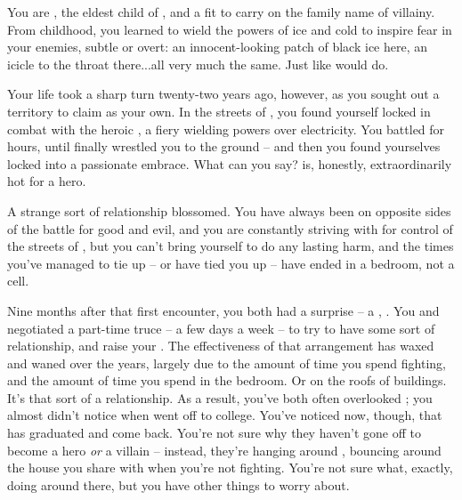 \documentclass[char]{LRSguildcamp1}
\begin{document}
\name{\cOldest{}}

You are \cOldest{\intro}, the eldest child of \cGrandma{\intro}, and a \cOldest{\offspring} fit to carry on the family name of villainy.  
From childhood, you learned to wield the powers of ice and cold to inspire fear in your enemies, subtle or overt: an innocent-looking patch of black ice here, an icicle to the throat there...all very much the same.  Just like \cGrandma{\Parent} would do.


Your life took a sharp turn twenty-two years ago, however, as you sought out a territory to claim as your own.  In the streets of \pCityO{}, you found yourself locked in combat with the heroic \cOS{\intro}, a fiery \cOS{\hero} wielding powers over electricity.  You battled for hours, until \cOldest{\they} finally wrestled you to the ground -- and then you found yourselves locked into a passionate embrace.  What can you say?  \cOS{} is, honestly, extraordinarily hot for a hero.

A strange sort of relationship blossomed.  You have always been on opposite sides of the battle for good and evil, and you are constantly striving with \cOS{\them} for control of the streets of \pCityO{}, but you can't bring yourself to do \cOS{\them} any lasting harm, and the times you've managed to tie \cOS{\them} up -- or \cOS{\they} have tied you up -- have ended in a bedroom, not a cell.

Nine months after that first encounter, you both had a surprise -- a \cGrad{\offspring}, \cGrad{\intro}.  You and \cOS{} negotiated a part-time truce -- a few days a week -- to try to have some sort of relationship, and raise your \cGrad{\offspring}.  The effectiveness of that arrangement has waxed and waned over the years, largely due to the amount of time you spend fighting, and the amount of time you spend in the bedroom.  Or on the roofs of buildings.  It's that sort of a relationship.  As a result, you've both often overlooked \cGrad{}; you almost didn't notice when \cGrad{} went off to college.  You've noticed now, though, that \cGrad{} has graduated and come back.  You're not sure why they haven't gone off to become a hero \emph{or} a villain -- instead, they're hanging around \pCityO{}, bouncing around the house you share with \cOS{} when you're not fighting.  You're not sure what, exactly, \cGrad{\theyare} doing around there, but you have other things to worry about.
\end{document}
